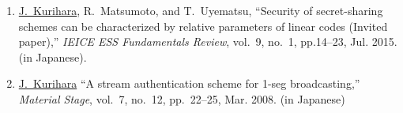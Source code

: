 \begin{enumerate}
 \item \underline{J.~Kurihara}, R.~Matsumoto, and T.~Uyematsu, ``Security of secret-sharing schemes can be characterized by relative parameters of linear codes (Invited paper),'' \textit{IEICE ESS Fundamentals Review}, vol.~9, no.~1, pp.14--23, Jul. 2015. (in Japanese).
 \item \underline{J.~Kurihara} ``A stream authentication scheme for 1-seg broadcasting,'' \textit{Material Stage}, vol.~7, no.~12, pp.~22--25, Mar. 2008. (in Japanese)
\end{enumerate}